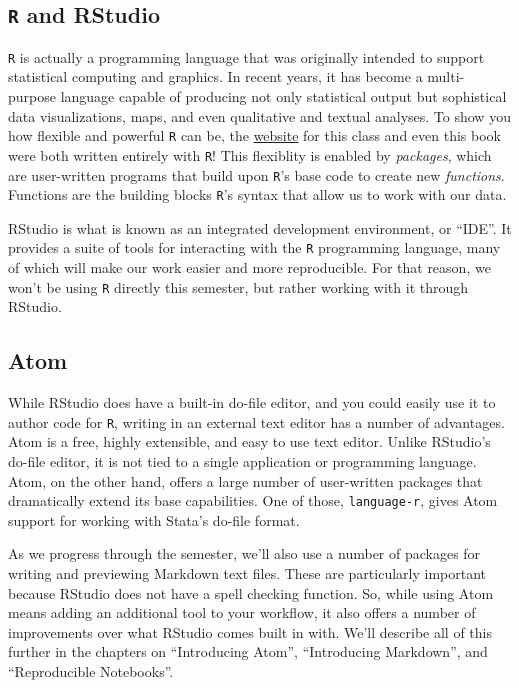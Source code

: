 \documentclass[]{book}
\theoremstyle{definition}
\theoremstyle{definition}
\theoremstyle{remark}
\begin{document}
\subsection{\texorpdfstring{\texttt{R} and
RStudio}{R and RStudio}}\label{r-and-rstudio}

\texttt{R} is actually a programming language that was originally
intended to support statistical computing and graphics. In recent years,
it has become a multi-purpose language capable of producing not only
statistical output but sophistical data visualizations, maps, and even
qualitative and textual analyses. To show you how flexible and powerful
\texttt{R} can be, the \href{https://slu-soc5050.github.io}{website} for
this class and even this book were both written entirely with
\texttt{R}! This flexiblity is enabled by \emph{packages}, which are
user-written programs that build upon \texttt{R}'s base code to create
new \emph{functions}. Functions are the building blocks \texttt{R}'s
syntax that allow us to work with our data.

RStudio is what is known as an integrated development environment, or
``IDE''. It provides a suite of tools for interacting with the
\texttt{R} programming language, many of which will make our work easier
and more reproducible. For that reason, we won't be using \texttt{R}
directly this semester, but rather working with it through RStudio.

\subsection{Atom}\label{atom}

While RStudio does have a built-in do-file editor, and you could easily
use it to author code for \texttt{R}, writing in an external text editor
has a number of advantages. Atom is a free, highly extensible, and easy
to use text editor. Unlike RStudio's do-file editor, it is not tied to a
single application or programming language. Atom, on the other hand,
offers a large number of user-written packages that dramatically extend
its base capabilities. One of those, \texttt{language-r}, gives Atom
support for working with Stata's do-file format.

As we progress through the semester, we'll also use a number of packages
for writing and previewing Markdown text files. These are particularly
important because RStudio does not have a spell checking function. So,
while using Atom means adding an additional tool to your workflow, it
also offers a number of improvements over what RStudio comes built in
with. We'll describe all of this further in the chapters on
``Introducing Atom'', ``Introducing Markdown'', and ``Reproducible
Notebooks''.
\end{document}
